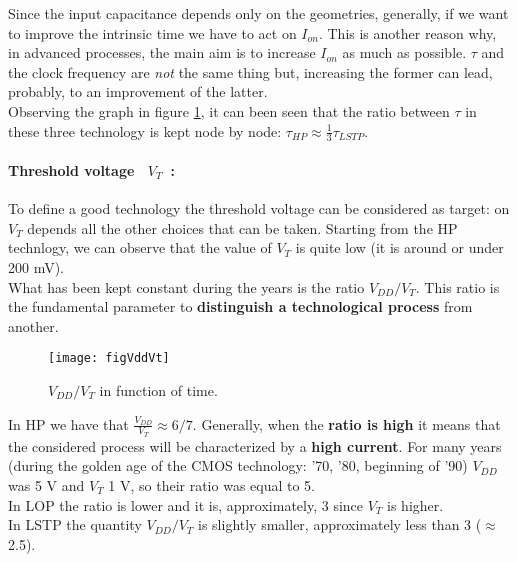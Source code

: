 \documentclass[a4paper, 12pt, twoside, openright]{report}
\begin{document}
Since the input capacitance depends only on the geometries, generally, if we want to improve the intrinsic time we have to act on $I_{on}$. This is another reason why, in advanced processes, the main aim is to increase $I_{on}$ as much as possible. $\tau$ and the clock frequency are \emph{not} the same thing but, increasing the former can lead, probably, to an improvement of the latter.\\
Observing the graph in figure \ref{tau}, it can been seen that the ratio between $\tau$ in these three technology is kept node by node: $\tau_{HP} \approx \frac{1}{3} \tau_{LSTP}$.


\paragraph{Threshold voltage~  $V_{T}$~:} To define a good technology the threshold voltage can be considered as target: on $V_{T}$ depends all the other choices that can be taken. Starting from the HP technlogy, we can observe that the value of $V_{T}$ is quite low (it is around or under 200 mV).\\
What has been kept constant during the years is the ratio $V_{DD}/V_{T}$. This ratio is the fundamental parameter to \textbf{distinguish a technological process} from another.

	\begin{figure}[H]
	\centering
	\texttt{[image: figVddVt]}
	\caption{$V_{DD}/V_{T}$ in function of time.}
	\label{tau}
	\end{figure}

In HP we have that $\frac{V_{DD}}{V_{T}} \approx 6/7$. Generally, when the \textbf{ratio is high} it means that the considered process will be characterized by a \textbf{high current}. For many years (during the golden age of the CMOS technology: '70, '80, beginning of '90) $V_{DD}$ was 5 V and $V_{T}$ 1 V, so their ratio was equal to 5.\\
In LOP the ratio is lower and it is, approximately, 3 since $V_{T}$ is higher.\\
In LSTP the quantity $V_{DD}/V_{T}$ is slightly smaller, approximately less than 3 ($\approx$ 2.5).
\end{document}
